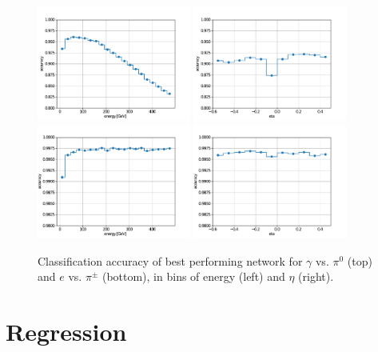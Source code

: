 \begin{figure}[htbp]
\centering
\includegraphics[width=0.45\textwidth]{Images/Calo/gamma_pi0_accuracy_energy_bins.pdf}
\includegraphics[width=0.45\textwidth]{Images/Calo/gamma_pi0_accuracy_eta_bins.pdf} \\
\includegraphics[width=0.45\textwidth]{Images/Calo/ele_chpi_accuracy_energy_bins.pdf}
\includegraphics[width=0.45\textwidth]{Images/Calo/ele_chpi_accuracy_eta_bins.pdf}
\caption{Classification accuracy of best performing network for $\gamma$ vs. $\pi^0$ (top) and $e$ vs. $\pi^\pm$ (bottom), in bins of energy (left) and $\eta$ (right).}
\label{fig:accuracy_bins}
\end{figure}

\section{Regression}

